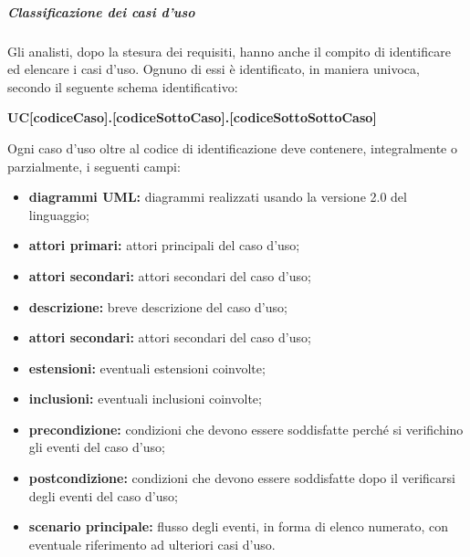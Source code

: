 				\subparagraph{Classificazione dei casi d'uso}
					Gli analisti, dopo la stesura dei requisiti, hanno anche il compito di identificare ed elencare i casi d’uso. Ognuno di essi è identificato, in maniera univoca, secondo il seguente schema identificativo:
					\begin{center}
						\textbf{UC[codiceCaso].[codiceSottoCaso].[codiceSottoSottoCaso]}
					\end{center}
					Ogni caso d'uso oltre al codice di identificazione deve contenere, integralmente o parzialmente, i seguenti campi:
					\begin{itemize}
						\item \textbf{diagrammi UML:} diagrammi realizzati usando la versione 2.0 del linguaggio;
						\item \textbf{attori primari:} attori principali del caso d’uso;
						\item \textbf{attori secondari:} attori secondari del caso d’uso;
						\item \textbf{descrizione:} breve descrizione del caso d'uso;
						\item \textbf{attori secondari:} attori secondari del caso d’uso;
						\item \textbf{estensioni:} eventuali estensioni coinvolte;
						\item \textbf{inclusioni:} eventuali inclusioni coinvolte;
						\item \textbf{precondizione:} condizioni che devono essere soddisfatte perché si verifichino gli eventi del caso d’uso;
						\item \textbf{postcondizione:} condizioni che devono essere soddisfatte dopo il verificarsi degli eventi del caso d’uso;
						\item \textbf{scenario principale:} flusso degli eventi, in forma di elenco numerato, con eventuale riferimento ad ulteriori casi d’uso.
					\end{itemize}

